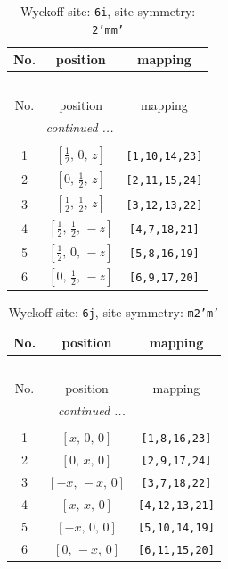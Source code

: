 \documentclass[fleqn,8pt]{jsarticle}
\begin{document}
\renewcommand{\arraystretch}{1.2}
\begin{longtable}{ccc}
\caption{Wyckoff site: {\tt 6i}, site symmetry: {\tt 2'mm'}}
 \\
 \hline \hline
No. & position & mapping \\ \hline \endfirsthead

\multicolumn{2}{l}{\tablename\ \thetable{}} \\
 \hline \hline
No. & position & mapping \\ \hline \endhead

 \hline \hline
\multicolumn{2}{r}{\footnotesize\it continued ...} \\ \endfoot

 \hline \hline
\multicolumn{2}{r}{} \\ \endlastfoot

1 & $\left[ \frac{1}{2},\, 0,\, z \right]$ & {\tt [1,10,14,23]} \\ \hline
2 & $\left[ 0,\, \frac{1}{2},\, z \right]$ & {\tt [2,11,15,24]} \\ \hline
3 & $\left[ \frac{1}{2},\, \frac{1}{2},\, z \right]$ & {\tt [3,12,13,22]} \\ \hline
4 & $\left[ \frac{1}{2},\, \frac{1}{2},\, - z \right]$ & {\tt [4,7,18,21]} \\ \hline
5 & $\left[ \frac{1}{2},\, 0,\, - z \right]$ & {\tt [5,8,16,19]} \\ \hline
6 & $\left[ 0,\, \frac{1}{2},\, - z \right]$ & {\tt [6,9,17,20]} \\
\end{longtable}
\renewcommand{\arraystretch}{1.2}
\begin{longtable}{ccc}
\caption{Wyckoff site: {\tt 6j}, site symmetry: {\tt m2'm'}}
 \\
 \hline \hline
No. & position & mapping \\ \hline \endfirsthead

\multicolumn{2}{l}{\tablename\ \thetable{}} \\
 \hline \hline
No. & position & mapping \\ \hline \endhead

 \hline \hline
\multicolumn{2}{r}{\footnotesize\it continued ...} \\ \endfoot

 \hline \hline
\multicolumn{2}{r}{} \\ \endlastfoot

1 & $\left[ x,\, 0,\, 0 \right]$ & {\tt [1,8,16,23]} \\ \hline
2 & $\left[ 0,\, x,\, 0 \right]$ & {\tt [2,9,17,24]} \\ \hline
3 & $\left[ - x,\, - x,\, 0 \right]$ & {\tt [3,7,18,22]} \\ \hline
4 & $\left[ x,\, x,\, 0 \right]$ & {\tt [4,12,13,21]} \\ \hline
5 & $\left[ - x,\, 0,\, 0 \right]$ & {\tt [5,10,14,19]} \\ \hline
6 & $\left[ 0,\, - x,\, 0 \right]$ & {\tt [6,11,15,20]} \\
\end{longtable}
\end{document}
